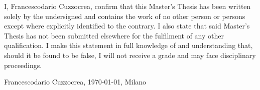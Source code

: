 I, Francescodario Cuzzocrea, confirm that this Master’s Thesis has been written solely by the undersigned and contains the work of no other person or persons except where explicitly identified to the contrary. I also state that said Master’s Thesis has not been submitted elsewhere for the fulfilment of any other qualification. I make this statement in full knowledge of and understanding that, should it be found to be false, I will not receive a grade and
may face disciplinary proceedings.

\vspace{\baselineskip}

Francescodario Cuzzocrea, \today, Milano